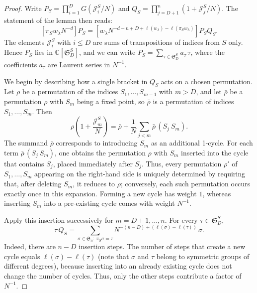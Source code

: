 \documentclass{article}
\theoremstyle{plain}
\theoremstyle{definition}
\numberwithin{equation}{section}
\begin{document}
\begin{proof}
    Write $P_S=\prod_{i=1}^{D} G\left(\mathcal{J}_{i}^S/N\right)$ and $Q_S=\prod_{j=D+1}^n \left(1+\mathcal{J}_{j}^S/N\right)$. The statement of the lemma then reads:
    \begin{equation}
        \label{eq:RemovingS_PSQS}
        \left[\pi_S w_\lambda N^{-d}\right] P_S = \left[w_\lambda N^{-d - n+D + \ell(w_\lambda) - \ell(\pi_S w_\lambda)}\right] P_S  Q_S.
    \end{equation}
    The elements $\mathcal{J}_i^S$ with $i\le D$ are sums of transpositions of indices from $S$ only. Hence $P_S$ lies in $\mathbb{C}[\mathfrak{S}_D^S]$, and we can write $P_S=\sum_{\tau\in\mathfrak{S}_D^S} a_\tau\,\tau$, where the coefficients $a_\tau$ are Laurent series in $N^{-1}$.

    We begin by describing how a single bracket in $Q_S$ acts on a chosen permutation. Let $\rho$ be a permutation of the indices $S_1,\dots,S_{m-1}$ with $m>D$, and let $\bar \rho$ be a permutation $\rho$ with $S_m$ being a fixed point, so $\bar \rho$ is a permutation of indices $S_1,\dots,S_{m}$. Then
    \begin{equation}
    \rho\left(1+\frac{\mathcal{J}_m^S}{N}\right)=\bar \rho+\frac1N\sum_{j<m} \bar\rho\,(S_j\ S_m).
    \end{equation}
    The summand $\bar \rho$ corresponds to introducing $S_m$ as an additional 1-cycle. For each term $\bar \rho\,(S_j\ S_m)$, one obtains the permutation $\rho$ with $S_m$ inserted into the cycle that contains $S_j$, placed immediately after $S_j$. Thus, every permutation $\rho'$ of $S_1,\dots,S_m$ appearing on the right-hand side is uniquely determined by requiring that, after deleting $S_m$, it reduces to $\rho$; conversely, each such permutation occurs exactly once in this expansion. Forming a new cycle has weight $1$, whereas inserting $S_m$ into a pre-existing cycle comes with weight $N^{-1}$.

    Apply this insertion  successively for $m=D+1,\dots,n$. For every $\tau\in\mathfrak{S}_D^S$,
    \begin{equation}
        \tau\, Q_S=\sum_{\sigma\in\mathfrak{S}_n:\ \pi_S\sigma=\tau} N^{-(n-D)+(\ell(\sigma)-\ell(\tau))}\,\sigma .
    \end{equation}
    Indeed, there are $n-D$ insertion steps. The number of steps that create a new cycle equals $\ell(\sigma)-\ell(\tau)$ (note that $\sigma$ and $\tau$ belong to symmetric groups of different degrees), because inserting into an already existing cycle does not change the number of cycles. Thus, only the other steps contribute a factor of $N^{-1}$.


\end{proof}
\end{document}
